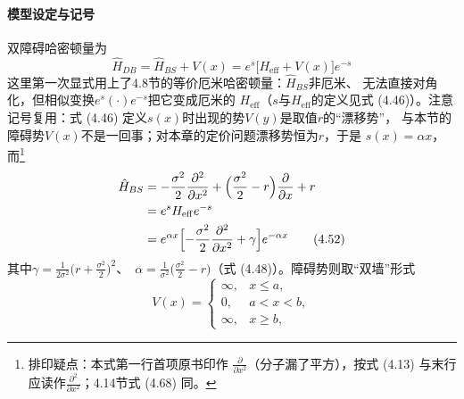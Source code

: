 \paragraph{模型设定与记号}
双障碍哈密顿量为
\begin{equation*}
\hat{H}_{DB}=\hat{H}_{BS}+V(x)=e^{s}\bigl[H_{\mathrm{eff}}+V(x)\bigr]e^{-s}
\tag{4.51}
\end{equation*}
这里第一次显式用上了4.8节的等价厄米哈密顿量：$\hat{H}_{BS}$非厄米、
无法直接对角化，但相似变换$e^{s}(\cdot)e^{-s}$把它变成厄米的
$H_{\mathrm{eff}}$（$s$与$H_{\mathrm{eff}}$的定义见式 (4.46)）。注意
记号复用：式 (4.46) 定义$s(x)$时出现的势$V(y)$是取值$r$的“漂移势”，
与本节的障碍势$V(x)$不是一回事；对本章的定价问题漂移势恒为$r$，于是
$s(x)=\alpha x$，而\footnote{排印疑点：本式第一行首项原书印作
$\frac{\partial}{\partial x^{2}}$（分子漏了平方），按式 (4.13) 与末行
应读作$\frac{\partial^{2}}{\partial x^{2}}$；4.14节式 (4.68) 同。}
\begin{align*}
\hat{H}_{BS}&=-\frac{\sigma^{2}}{2}\frac{\partial^{2}}{\partial x^{2}}
+\Bigl(\frac{\sigma^{2}}{2}-r\Bigr)\frac{\partial}{\partial x}+r\\
&=e^{s}H_{\mathrm{eff}}e^{-s}\\
&=e^{\alpha x}\Bigl[-\frac{\sigma^{2}}{2}\frac{\partial^{2}}{\partial x^{2}}
+\gamma\Bigr]e^{-\alpha x}
\tag{4.52}
\end{align*}
其中\mbox{$\gamma=\frac{1}{2\sigma^{2}}\bigl(r+\frac{\sigma^{2}}{2}\bigr)^{2}$、
$\alpha=\frac{1}{\sigma^{2}}\bigl(\frac{\sigma^{2}}{2}-r\bigr)$}（式
(4.48)）。障碍势则取“双墙”形式
\begin{equation*}
V(x)=
\begin{cases}
\infty, & x\leq a,\\
0, & a<x<b,\\
\infty, & x\geq b,
\end{cases}
\tag{4.53}
\end{equation*}

